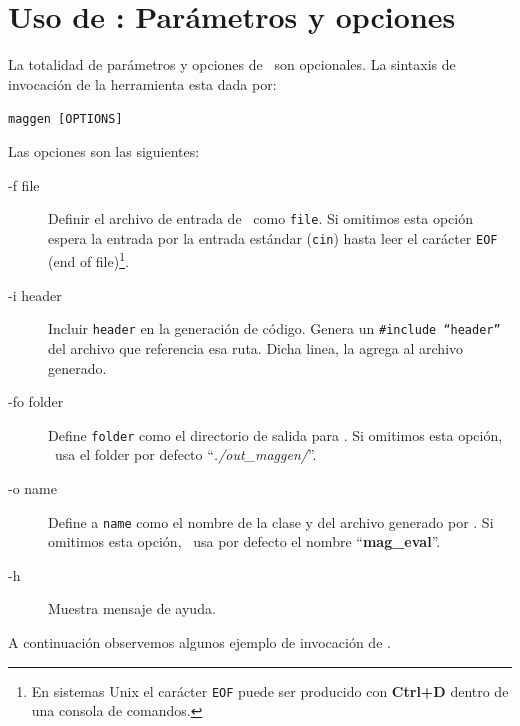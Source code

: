 \section{Uso de \maggen: Parámetros y opciones}
\label{sec:uso-maggen}
La totalidad de parámetros y opciones de \maggen\ son opcionales. La sintaxis de invocación de la herramienta esta dada por:\\
\begin{center}\texttt{maggen [OPTIONS]}\end{center}
Las opciones son las siguientes:
\begin{description}
\item [-f  file] Definir el archivo de entrada de \maggen\ como \texttt{file}. Si omitimos esta opción \maggen espera la entrada por la entrada estándar (\texttt{cin}) hasta leer el carácter \texttt{EOF} (end of file)\footnote{En sistemas Unix el carácter \texttt{EOF} puede ser producido con \textbf{Ctrl+D} dentro de una consola de comandos.}.
\item [-i  header] Incluir \texttt{header} en la generación de código. Genera un \texttt{\#include ``header''} del archivo que referencia esa ruta. Dicha linea, \maggen la agrega al archivo generado.
\item [-fo folder] Define \texttt{folder} como el directorio de salida para \maggen. Si omitimos esta opción, \maggen\ usa el folder por defecto ``\textit{./out\_maggen/}''.
\item [-o  name] Define a \texttt{name} como el nombre de la clase y del archivo generado por \maggen. Si omitimos esta opción, \maggen\ usa por defecto el nombre ``\textbf{mag\_eval}''.
\item [-h] Muestra mensaje de ayuda.
\end{description}
A continuación observemos algunos ejemplo de invocación de \maggen.
